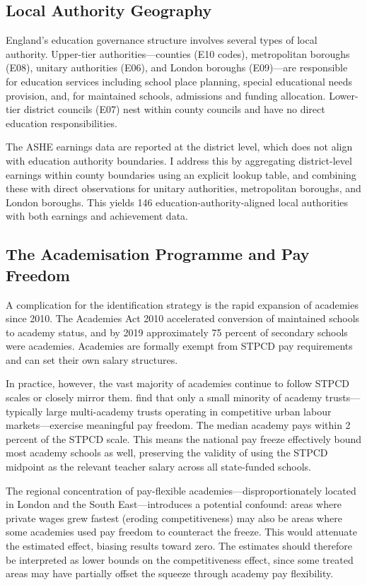 \documentclass[12pt]{article}
\begin{document}
\subsection{Local Authority Geography}

England's education governance structure involves several types of local authority. Upper-tier authorities---counties (E10 codes), metropolitan boroughs (E08), unitary authorities (E06), and London boroughs (E09)---are responsible for education services including school place planning, special educational needs provision, and, for maintained schools, admissions and funding allocation. Lower-tier district councils (E07) nest within county councils and have no direct education responsibilities.

The ASHE earnings data are reported at the district level, which does not align with education authority boundaries. I address this by aggregating district-level earnings within county boundaries using an explicit lookup table, and combining these with direct observations for unitary authorities, metropolitan boroughs, and London boroughs. This yields 146 education-authority-aligned local authorities with both earnings and achievement data.

\subsection{The Academisation Programme and Pay Freedom}

A complication for the identification strategy is the rapid expansion of academies since 2010. The Academies Act 2010 accelerated conversion of maintained schools to academy status, and by 2019 approximately 75 percent of secondary schools were academies. Academies are formally exempt from STPCD pay requirements and can set their own salary structures.

In practice, however, the vast majority of academies continue to follow STPCD scales or closely mirror them. \citet{britton2016teacher} find that only a small minority of academy trusts---typically large multi-academy trusts operating in competitive urban labour markets---exercise meaningful pay freedom. The median academy pays within 2 percent of the STPCD scale. This means the national pay freeze effectively bound most academy schools as well, preserving the validity of using the STPCD midpoint as the relevant teacher salary across all state-funded schools.

The regional concentration of pay-flexible academies---disproportionately located in London and the South East---introduces a potential confound: areas where private wages grew fastest (eroding competitiveness) may also be areas where some academies used pay freedom to counteract the freeze. This would attenuate the estimated effect, biasing results toward zero. The estimates should therefore be interpreted as lower bounds on the competitiveness effect, since some treated areas may have partially offset the squeeze through academy pay flexibility.
\end{document}
